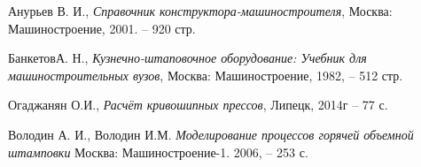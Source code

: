 \documentclass[a4paper,14pt]{article}
\begin{document}
 \begin{thebibliography}{4}


  Анурьев В. И., \textsl{Справочник конструктора-машиностроителя}, Москва: Машиностроение, 2001. -- 920 стр.

  БанкетовА. Н., \textsl{Кузнечно-штаповочное оборудование: Учебник для машиностроительных вузов}, Москва: Машиностроение, 1982, -- 512 стр.

  Огаджанян О.И.,\textsl{ Расчёт кривошипных прессов}, Липецк, 2014г -- 77 с.

  Володин А. И., Володин И.М.\textsl{ Моделирование процессов горячей объемной штамповки} Москва: Машиностроение-1. 2006, -- 253 с.

 \end{thebibliography}
\end{document}
